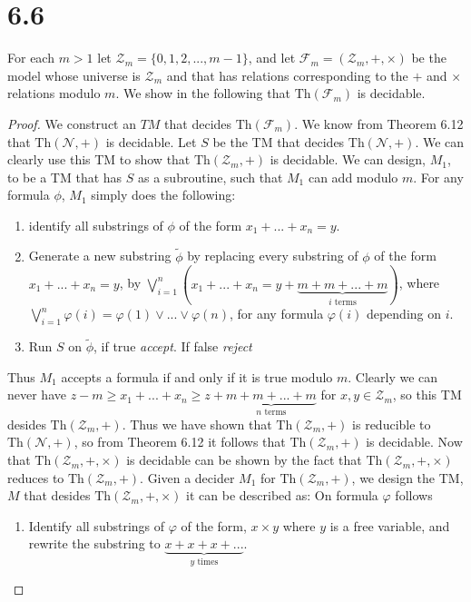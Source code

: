 \documentclass[a4paper,11pt]{article}
\numberwithin{equation}{section}
\begin{document}
\section*{6.6}
For each $ m>1 $ let $ \mathcal{Z}_m=\{0,1,2,...,m-1\} $, and let $ \mathcal{F}_m=(\mathcal{Z}_m,+,\times) $ be the model whose universe is $ \mathcal{Z}_m $ and that has relations corresponding to the $ + $ and $ \times $ relations modulo $ m $. We show in the following that $ \text{Th}(\mathcal{F}_m) $ is decidable. \begin{proof}
	We construct an $ TM $ that decides $ \text{Th}(\mathcal{F}_m) $. We know from Theorem 6.12 that $ \text{Th}(\mathcal{N},+) $ is decidable. Let $ S $ be the TM that decides $ \text{Th}(\mathcal{N},+) $. We can clearly use this TM to show that $ \text{Th}(\mathcal{Z}_m,+) $ is decidable. We can design, $ M_1  $, to be a TM that has $ S $ as a subroutine, such that $ M_1 $ can add modulo $ m $. For any formula $ \phi $, $ M_1 $ simply does the following:
	\begin{enumerate}
		\item identify all substrings of $ \phi $ of the form $ x_1+...+x_n=y $.
		\item Generate a new substring $ \tilde{\phi} $ by replacing every substring of $ \phi $ of the form $ x_1+...+x_n=y $, by $ \bigvee_{i=1}^n(x_1+...+x_n=y+\underbrace{m+m+...+m}_{i\text{ terms}}) $, where $ \bigvee_{i=1}^{n}\varphi(i)=\varphi(1)\vee...\vee\varphi(n) $, for any formula $ \varphi(i) $ depending on $ i $.
		\item Run $ S $ on $ \tilde{\phi} $, if true \emph{accept}. If false \emph{reject}
	\end{enumerate}
	Thus $M_1 $ accepts a formula if and only if it is true modulo $ m $. Clearly we can never have $ z-m\geq x_1+...+x_n\geq z+\underbrace{m+m+...+m}_{n\text{ terms}} $ for $ x,y\in \mathcal{Z}_m  $, so this TM desides $ \text{Th}(\mathcal{Z}_m,+) $. Thus we have shown that $ \text{Th}(\mathcal{Z}_m,+)$ is reducible to $ \text{Th}(\mathcal{\mathcal{N}},+) $, so from Theorem 6.12 it follows that $ \text{Th}(\mathcal{Z}_m,+) $ is decidable. Now that $ \text{Th}(\mathcal{Z}_m,+,\times) $ is decidable can be shown by the fact that $ \text{Th}(\mathcal{Z}_m,+,\times)$ reduces to  $\text{Th}(\mathcal{Z}_m,+) $. Given a decider $ M_1 $ for $ \text{Th}(\mathcal{Z}_m,+) $, we design the TM, $ M $ that desides $ \text{Th}(\mathcal{Z}_m,+,\times) $ it can be described as: On formula $ \varphi $ follows\begin{enumerate}
		\item Identify all substrings of $ \varphi $ of the form, $ x\times y $ where $ y $ is a free variable, and rewrite the substring to $ \underbrace{x+x+x+...}_{y\text{ times}} $.

\end{enumerate}
\end{proof}
\end{document}

